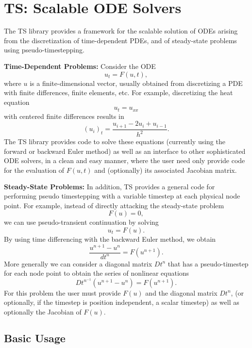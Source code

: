 \chapter{TS: Scalable ODE Solvers}
\label{chapter_ts}

The TS library provides a framework for the scalable solution of ODEs
arising from the discretization of time-dependent PDEs, and of
steady-state problems using pseudo-timestepping.

\vspace{.2cm}

\noindent

{\bf Time-Dependent Problems:} Consider the ODE
\[
              u_t = F(u,t),
\]
where $ u $ is a finite-dimensional vector, usually obtained from
discretizing a PDE with finite differences, finite elements, etc.
For example, discretizing the heat equation 
\[
          u_t = u_{xx} 
\]
with centered finite differences results in 
\[
          (u_i)_t = \frac{u_{i+1} - 2 u_{i} + u_{i-1}}{h^2}.
\]
The TS library provides code to solve these equations (currently 
using the forward or backward Euler method) as well as an interface to 
other sophisticated ODE solvers, in a clean and easy manner,
where the user need only provide code for the evaluation of $ F(u,t) $ and 
(optionally) its associated Jacobian matrix.

\vspace{.2cm}

\noindent
{\bf Steady-State Problems:} 
In addition, TS provides a general code for performing pseudo timestepping
with a variable timestep at each physical node point. For example, instead of
directly attacking the steady-state problem
\[
           F(u) = 0,
\]
we can use pseudo-transient continuation by solving
\[
           u_t = F(u).
\]
By using time differencing with the backward Euler method, we obtain
\[
           \frac{u^{n+1} - u^{n}}{dt^{n}} = F(u^{n+1}).
\]
More generally we can consider a diagonal matrix $ Dt^{n} $ that has a
pseudo-timestep for each node point to obtain the series of nonlinear equations
\[
        Dt^{n^{-1}}(u^{n+1} - u^{n}) =  F(u^{n+1}).
\]
For this problem the user must provide $ F(u) $ and the diagonal 
matrix $ Dt^{n} $, (or optionally, if the timestep is position independent,
a scalar timestep) as well as optionally the Jacobian of $ F(u).$ 

\section{Basic Usage}

